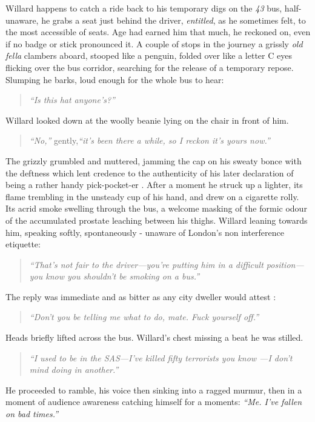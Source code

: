 Willard happens to catch a ride back to his temporary digs on the \emph{43} bus, half-unaware, he grabs a seat just behind the driver, \emph{entitled}, as he sometimes felt, to the most accessible of seats. Age had earned him that much, he reckoned on, even if no badge or stick pronounced it. A couple of stops in the journey a grissly \emph{old fella} clambers aboard, stooped like a penguin, folded over like a letter C eyes flicking over the bus corridor, searching for the release of a temporary repose.  Slumping he barks, loud enough for the whole bus to hear:
\begin{quote}
\emph{``Is this hat anyone's?''}
\end{quote}

Willard looked down at the woolly beanie lying on the chair in front of him.
\begin{quote}
\emph{``No,''} gently,\emph{``it's been there a while, so I reckon it's yours now.''}
\end{quote}

The grizzly grumbled and muttered, jamming the cap on his sweaty bonce with the deftness which lent credence to the authenticity of his later declaration of being a rather  handy pick-pocket-er . After a moment he struck up a lighter, its flame trembling in the unsteady cup of his hand, and drew on a cigarette rolly. Its acrid smoke swelling through the bus, a welcome masking of the formic odour of the accumulated prostate leaching between his thighs. Willard leaning towards him, speaking softly, spontaneously - unaware of London's non interference etiquette:
\begin{quote}
\emph{``That's not fair to the driver—you’re putting him in a difficult position—you know you shouldn't be smoking on a bus.''}
\end{quote}
The reply was immediate and as bitter as any city dweller would attest :
\begin{quote}
\emph{``Don't you be telling me what to do, mate. Fuck yourself off.''}
\end{quote}

Heads briefly lifted across the bus. Willard's chest missing a beat he was stilled.

\begin{quote}
\emph{``I used to be in the SAS—I’ve killed fifty terrorists you know —I don’t mind doing in another.''}
\end{quote}

He proceeded to ramble, his voice then sinking into a ragged murmur, then in a moment of audience awareness catching himself for a moments:
\emph{``Me. I’ve fallen on bad times.''}

